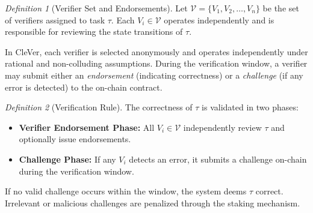 \documentclass[3p]{elsarticle}
\theoremstyle{remark}
\newtheorem{definition}{Definition}
\begin{document}
\begin{definition}[Verifier Set and Endorsements]\label{def:verifier-set}
Let $\mathcal{V} = \{V_1, V_2, \dots, V_n\}$ be the set of verifiers assigned to task $\tau$. Each $V_i \in \mathcal{V}$ operates independently and is responsible for reviewing the state transitions of $\tau$.
\end{definition}

In CleVer, each verifier is selected anonymously and operates independently under rational and non-colluding assumptions. During the verification window, a verifier may submit either an \textit{endorsement} (indicating correctness) or a \textit{challenge} (if any error is detected) to the on-chain contract.

\begin{definition}[Verification Rule]\label{def:verify-rule}
The correctness of $\tau$ is validated in two phases:
\begin{itemize}
    \item \textbf{Verifier Endorsement Phase:} All $V_i \in \mathcal{V}$ independently review $\tau$ and optionally issue endorsements.
    \item \textbf{Challenge Phase:} If any $V_i$ detects an error, it submits a challenge on-chain during the verification window.
\end{itemize}
If no valid challenge occurs within the window, the system deems $\tau$ correct. Irrelevant or malicious challenges are penalized through the staking mechanism.
\end{definition}
\end{document}
